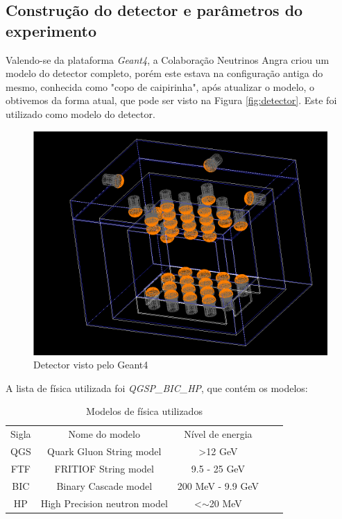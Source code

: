 \subsection{Construção do detector e parâmetros do experimento}

Valendo-se da plataforma \textit{Geant4}, a Colaboração Neutrinos Angra criou um modelo do detector completo, porém este estava na configuração antiga do mesmo, conhecida como "copo de caipirinha", após atualizar o modelo, o obtivemos da forma atual, que pode ser visto na Figura \ref{fig:detector}. Este foi utilizado como modelo do detector. 

\begin{figure}[H]
	\centering
	\includegraphics[width=16cm]{textuais/simulacao/figuras/sim_det.png}
	\caption{Detector visto pelo Geant4}
	\label{fig:simdetector}
\end{figure}

A lista de física utilizada foi \emph{QGSP\_BIC\_HP}, que contém os modelos:



\begin{table}[H]
	\centering
	\begin{tabular}{|c|c|c|ll}
		\cline{1-3}
		Sigla & Nome do modelo               & Nível de energia        &  &  \\ \cline{1-3}
		QGS   & Quark Gluon String model     & \textgreater 12 GeV     &  &  \\ \cline{1-3}
		FTF   & FRITIOF String model         & 9.5 - 25 GeV            &  &  \\ \cline{1-3}
		BIC   & Binary Cascade model         & 200 MeV - 9.9 GeV       &  &  \\ \cline{1-3}
		HP    & High Precision neutron model & \textless{}$\sim$20 MeV &  &  \\ \cline{1-3}
	\end{tabular}
	\caption{Modelos de física utilizados}
\end{table}

